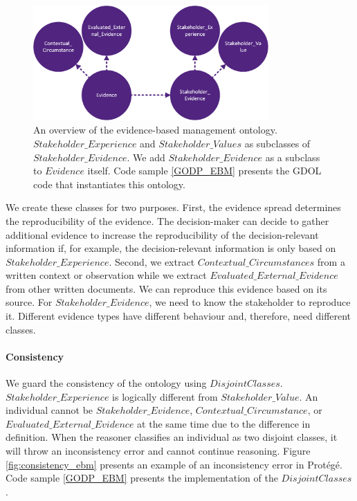 \begin{figure}[hbpt]
\centering
  \includegraphics[width=9cm]{../../Images/04_Contribution/04_EBM_Classification.png}
  \caption{An overview of the evidence-based management ontology. $Stakeholder\_Experience$ and $Stakeholder\_Values$ as subclasses of $Stakeholder\_Evidence$. We add $Stakeholder\_Evidence$ as a subclass to $Evidence$ itself. Code sample \ref{GODP_EBM} presents the GDOL code that instantiates this ontology.}
  \label{fig:classification}
\end{figure} 

We create these classes for two purposes. First, the evidence spread determines the reproducibility of the evidence. The decision-maker can decide to gather additional evidence to increase the reproducibility of the decision-relevant information if, for example, the decision-relevant information is only based on $Stakeholder\_Experience$. Second, we extract $Contextual\_Circumstances$ from a written context or observation while we extract $Evaluated\_External\_Evidence$ from other written documents. We can reproduce this evidence based on its source. For $Stakeholder\_Evidence$, we need to know the stakeholder to reproduce it. Different evidence types have different behaviour and, therefore, need different classes.

\paragraph{Consistency}
We guard the consistency of the ontology using $DisjointClasses$. $Stakeholder\_Experience$ is logically different from $Stakeholder\_Value$. An individual cannot be $Stakeholder\_Evidence$, $Contextual\_Circumstance$, or $Evaluated\_External\_Evidence$ at the same time due to the difference in definition. When the reasoner classifies an individual as two disjoint classes, it will throw an inconsistency error and cannot continue reasoning. Figure \ref{fig:consistency_ebm} presents an example of an inconsistency error in Prot\'eg\'e. Code sample \ref{GODP_EBM} presents the implementation of the $DisjointClasses$.

